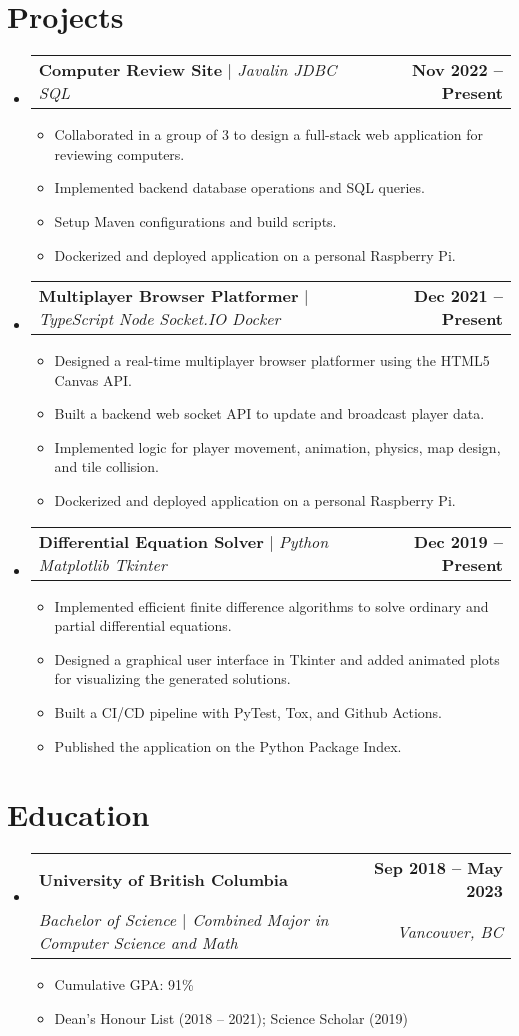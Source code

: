 \documentclass[letterpaper,11pt]{article}
\makeatletter
\newcommand{\resumeItem}[1]{
  \item\small{
    {#1 \vspace{-2pt}}
  }
}
\newcommand{\resumeSubheading}[4]{
  \vspace{-2pt}\item
    \begin{tabular*}{1.0\textwidth}[t]{l@{\extracolsep{\fill}}r}
      \textbf{#1} & \textbf{\small #2} \\
      \textit{\small#3} & \textit{\small #4} \\
    \end{tabular*}\vspace{-7pt}
}
\newcommand{\resumeProjectHeading}[2]{
    \item
    \begin{tabular*}{1.001\textwidth}{l@{\extracolsep{\fill}}r}
      \small#1 & \textbf{\small #2}\\
    \end{tabular*}\vspace{-7pt}
}
\newcommand{\resumeSubHeadingListStart}{\begin{itemize}[leftmargin=0.0in, label={}]}
\newcommand{\resumeSubHeadingListEnd}{\end{itemize}}
\newcommand{\resumeItemListStart}{\begin{itemize}}
\newcommand{\resumeItemListEnd}{\end{itemize}\vspace{-5pt}}
\makeatother
\begin{document}
\section{Projects}
    \vspace{-5pt}
    \resumeSubHeadingListStart
      \resumeProjectHeading
          {\textbf{Computer Review Site} $|$ \emph{Javalin \textperiodcentered{} JDBC \textperiodcentered{} SQL}}{Nov 2022 -- Present}
          \resumeItemListStart
            \resumeItem{Collaborated in a group of 3 to design a full-stack web application for reviewing computers.}
            \resumeItem{Implemented backend database operations and SQL queries.}
            \resumeItem{Setup Maven configurations and build scripts.}
            \resumeItem{Dockerized and deployed application on a personal Raspberry Pi.}
          \resumeItemListEnd
          \vspace{-13pt}
      \resumeProjectHeading
          {\textbf{Multiplayer Browser Platformer} $|$ \emph{TypeScript \textperiodcentered{} Node \textperiodcentered{} Socket.IO \textperiodcentered{} Docker}}{Dec 2021 -- Present}
          \resumeItemListStart
            \resumeItem{Designed a real-time multiplayer browser platformer using the HTML5 Canvas API.}
            \resumeItem{Built a backend web socket API to update and broadcast player data.}
            \resumeItem{Implemented logic for player movement, animation, physics, map design, and tile collision.}
            \resumeItem{Dockerized and deployed application on a personal Raspberry Pi.}
          \resumeItemListEnd
          \vspace{-13pt}
      \resumeProjectHeading
          {\textbf{Differential Equation Solver} $|$ \emph{Python \textperiodcentered{} Matplotlib \textperiodcentered{} Tkinter}}{Dec 2019 -- Present}
          \resumeItemListStart
            \resumeItem{Implemented efficient finite difference algorithms to solve ordinary and partial differential equations.}
            \resumeItem{Designed a graphical user interface in Tkinter and added animated plots for visualizing the generated solutions.}
            \resumeItem{Built a CI/CD pipeline with PyTest, Tox, and Github Actions.}
            \resumeItem{Published the application on the Python Package Index.}
          \resumeItemListEnd
    \resumeSubHeadingListEnd
\vspace{-15pt}

\section{Education}
  \resumeSubHeadingListStart
    \resumeSubheading
      {University of British Columbia}{Sep 2018 -- May 2023}
      {Bachelor of Science $|$ Combined Major in Computer Science and Math}{Vancouver, BC}
      \resumeItemListStart
        \resumeItem{Cumulative GPA: 91\%}
        \resumeItem{Dean's Honour List (2018 -- 2021); Science Scholar (2019)}
      \resumeItemListEnd
  \resumeSubHeadingListEnd
\end{document}
